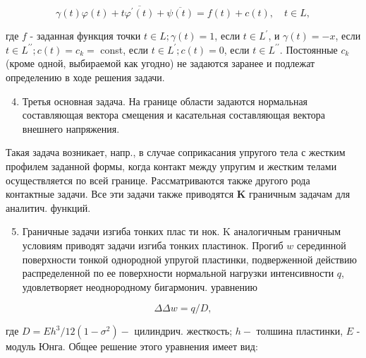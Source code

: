 \documentclass[10pt]{article}
\begin{document}
\[

\gamma(t) \varphi(t)+t \overline{\varphi^{\prime}(t)}+\overline{\psi(t)}=f(t)+c(t), \quad t \in L,

\]



где $f$ - заданная функция точки $t \in L ; \gamma(t)=1$, если $t \in L^{\prime}$, и $\gamma(t)=-x$, если $t \in L^{\prime \prime} ; c(t)=c_{k}=$ const, если $t \in L^{\prime} ; c(t)=0$, если $t \in L^{\prime \prime}$. Постоянные $c_{k}$ (кроме одной, выбираемой как угодно) не задаются заранее и подлежат определению в ходе решения задачи.



\begin{enumerate}

  \setcounter{enumi}{3}

  \item Третья основная задача. На границе области задаются нормальная составляющая вектора смещения и касательная составляющая вектора внешнего напряжения.

\end{enumerate}



Такая задача возникает, напр., в случае соприкасания упругого тела с жестким профилем заданной формы, когда контакт между упругим и жестким телами осуществляется по всей границе. Рассматриваются также другого рода контактные задачи. Все эти задачи также приводятся $\mathbf{K}$ граничным задачам для аналитич. функций.



\begin{enumerate}

  \setcounter{enumi}{4}

  \item Граничные задачи изгиба тонких плас ти нок. K аналогичным граничным условиям приводят задачи изгиба тонких пластинок. Прогиб $w$ серединной поверхности тонкой однородной упругой пластинки, подверженной действию распределенной по ее поверхности нормальной нагрузки интенсивности $q$, удовлетворяет неоднородному бигармонич. уравнению

\end{enumerate}



\[

\Delta \Delta w=q / D,

\]



где $D=E h^{3} / 12\left(1-\sigma^{2}\right)-$ цилиндрич. жесткость; $h-$ толшина пластинки, $E$ - модуль Юнга. Общее решение этого уравнения имеет вид:
\end{document}
